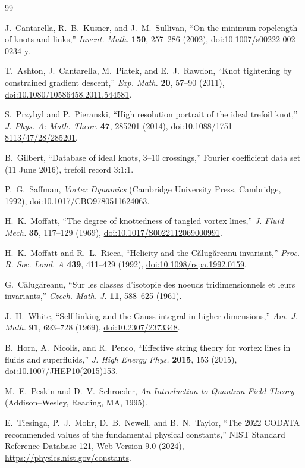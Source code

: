 \documentclass[aps,pre,preprint,notitlepage,nofootinbib,superscriptaddress]{revtex4-2}
\begin{document}
\begin{thebibliography}{99}

J.~Cantarella, R.~B.~Kusner, and J.~M.~Sullivan,
``On the minimum ropelength of knots and links,''
\emph{Invent. Math.} \textbf{150}, 257--286 (2002),
\href{https://doi.org/10.1007/s00222-002-0234-y}{doi:10.1007/s00222-002-0234-y}.

T.~Ashton, J.~Cantarella, M.~Piatek, and E.~J.~Rawdon,
``Knot tightening by constrained gradient descent,''
\emph{Exp. Math.} \textbf{20}, 57--90 (2011),
\href{https://doi.org/10.1080/10586458.2011.544581}{doi:10.1080/10586458.2011.544581}.

S.~Przybyl and P.~Pieranski,
``High resolution portrait of the ideal trefoil knot,''
\emph{J. Phys. A: Math. Theor.} \textbf{47}, 285201 (2014),
\href{https://doi.org/10.1088/1751-8113/47/28/285201}{doi:10.1088/1751-8113/47/28/285201}.

B.~Gilbert,
``Database of ideal knots, 3--10 crossings,'' Fourier coefficient data set
(11 June 2016), trefoil record 3:1:1.

P.~G.~Saffman,
\emph{Vortex Dynamics}
(Cambridge University Press, Cambridge, 1992),
\href{https://doi.org/10.1017/CBO9780511624063}{doi:10.1017/CBO9780511624063}.

H.~K.~Moffatt,
``The degree of knottedness of tangled vortex lines,''
\emph{J. Fluid Mech.} \textbf{35}, 117--129 (1969),
\href{https://doi.org/10.1017/S0022112069000991}{doi:10.1017/S0022112069000991}.

H.~K.~Moffatt and R.~L.~Ricca,
``Helicity and the C\u{a}lug\u{a}reanu invariant,''
\emph{Proc. R. Soc. Lond. A} \textbf{439}, 411--429 (1992),
\href{https://doi.org/10.1098/rspa.1992.0159}{doi:10.1098/rspa.1992.0159}.

G.~C\u{a}lug\u{a}reanu,
``Sur les classes d'isotopie des noeuds tridimensionnels et leurs invariants,''
\emph{Czech. Math. J.} \textbf{11}, 588--625 (1961).

J.~H.~White,
``Self-linking and the Gauss integral in higher dimensions,''
\emph{Am. J. Math.} \textbf{91}, 693--728 (1969),
\href{https://doi.org/10.2307/2373348}{doi:10.2307/2373348}.

B.~Horn, A.~Nicolis, and R.~Penco,
``Effective string theory for vortex lines in fluids and superfluids,''
\emph{J. High Energy Phys.} \textbf{2015}, 153 (2015),
\href{https://doi.org/10.1007/JHEP10(2015)153}{doi:10.1007/JHEP10(2015)153}.

M.~E.~Peskin and D.~V.~Schroeder,
\emph{An Introduction to Quantum Field Theory}
(Addison--Wesley, Reading, MA, 1995).

E.~Tiesinga, P.~J.~Mohr, D.~B.~Newell, and B.~N.~Taylor,
``The 2022 CODATA recommended values of the fundamental physical constants,''
NIST Standard Reference Database 121, Web Version 9.0 (2024),
\url{https://physics.nist.gov/constants}.

\end{thebibliography}
\end{document}
